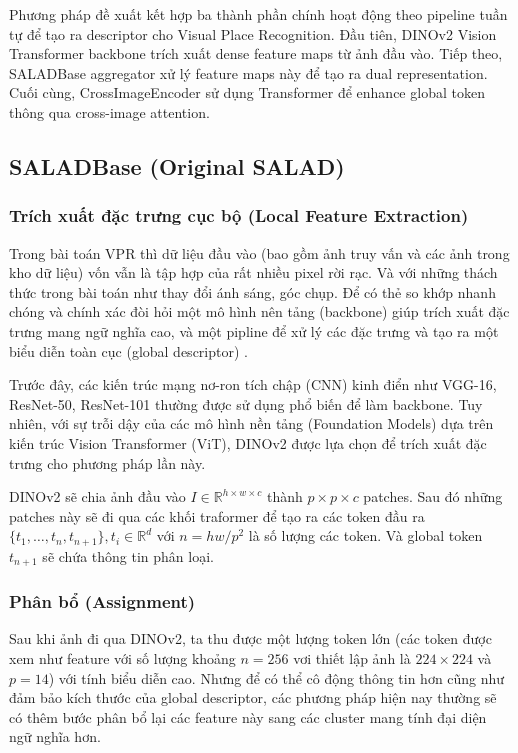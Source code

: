 \documentclass[12pt,a4paper]{article}
\begin{document}
    Phương pháp đề xuất kết hợp ba thành phần chính hoạt động theo pipeline tuần tự để tạo ra descriptor cho Visual Place Recognition. Đầu tiên, DINOv2 Vision Transformer backbone trích xuất dense feature maps từ ảnh đầu vào. Tiếp theo, SALADBase aggregator xử lý feature maps này để tạo ra dual representation. Cuối cùng, CrossImageEncoder sử dụng Transformer để enhance global token thông qua cross-image attention.

    \subsection{SALADBase (Original SALAD)}

    
    \subsubsection{Trích xuất đặc trưng cục bộ (Local Feature Extraction)}
    Trong bài toán VPR thì dữ liệu đầu vào (bao gồm ảnh truy vấn và các ảnh trong kho dữ liệu) vốn vẫn là tập hợp của rất nhiều pixel rời rạc. Và với những thách thức trong bài toán như thay đổi ánh sáng, góc chụp. Để có thẻ so khớp nhanh chóng và chính xác đòi hỏi một mô hình nên tảng (backbone) giúp trích xuất đặc trưng mang ngữ nghĩa cao, và một pipline để xử lý các đặc trưng và tạo ra một biểu diễn toàn cục (global descriptor) .
    
    Trước đây, các kiến trúc mạng nơ-ron tích chập (CNN) kinh điển như VGG-16, ResNet-50, ResNet-101 thường được sử dụng phổ biến để làm backbone. Tuy nhiên, với sự trỗi dậy của các mô hình nền tảng (Foundation Models) dựa trên kiến trúc Vision Transformer (ViT), DINOv2 được lựa chọn để trích xuất đặc trưng cho phương pháp lần này.
    
    DINOv2 sẽ chia ảnh đầu vào $I \in \mathbb{R}^{h \times w \times c}$ thành $p \times p \times c$  patches. Sau đó những patches này sẽ đi qua các khối traformer để tạo ra các token đầu ra $\{t_1, \ldots, t_n, t_{n+1}\}, t_i \in \mathbb{R}^d$ với $n = hw/p^2$ là số lượng các token. Và global token $t_{n+1}$ sẽ chứa thông tin phân loại.
    
    \subsubsection{Phân bổ (Assignment)}
    Sau khi ảnh đi qua DINOv2, ta thu được một lượng token lớn (các token được xem như feature với số lượng khoảng $n = 256$ vơi thiết lập ảnh là $224 \times 224$ và $p = 14$) với tính biểu diễn cao. Nhưng để có thể cô động thông tin hơn cũng như đảm bảo kích thước của global descriptor, các phương pháp hiện nay thường sẽ có thêm bước phân bổ lại các feature này sang các cluster mang tính đại diện ngữ nghĩa hơn.
    
\end{document}
